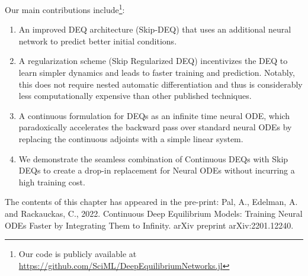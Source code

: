 Our main contributions include\footnote{Our code is publicly available at \url{https://github.com/SciML/DeepEquilibriumNetworks.jl}}:
%
\begin{enumerate}
  \item An improved DEQ architecture (Skip-DEQ) that uses an additional neural network to predict better initial conditions.

  \item A regularization scheme (Skip Regularized DEQ) incentivizes the DEQ to learn simpler dynamics and leads to faster training and prediction. Notably, this does not require nested automatic differentiation and thus is considerably less computationally expensive than other published techniques.

  \item A continuous formulation for DEQs as an infinite time neural ODE, which paradoxically accelerates the backward pass over standard neural ODEs by replacing the continuous adjoints with a simple linear system.

  \item We demonstrate the seamless combination of Continuous DEQs with Skip DEQs to create a drop-in replacement for Neural ODEs without incurring a high training cost.
\end{enumerate}
%

The contents of this chapter has appeared in the pre-print: Pal, A., Edelman, A. and Rackauckas, C., 2022. Continuous Deep Equilibrium Models: Training Neural ODEs Faster by Integrating Them to Infinity. arXiv preprint arXiv:2201.12240.~\citep{pal2022mixing}




